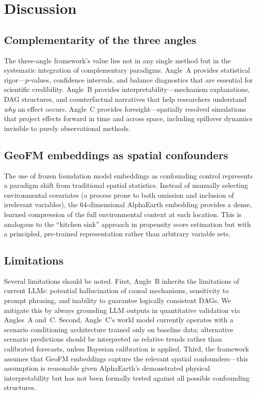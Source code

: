 \documentclass{article}
\begin{document}
\section{Discussion}
\label{sec:discussion}

\subsection{Complementarity of the three angles}

The three-angle framework's value lies not in any single method but in the systematic integration of complementary paradigms. Angle~A provides statistical rigor---$p$-values, confidence intervals, and balance diagnostics that are essential for scientific credibility. Angle~B provides interpretability---mechanism explanations, DAG structures, and counterfactual narratives that help researchers understand \textit{why} an effect occurs. Angle~C provides foresight---spatially resolved simulations that project effects forward in time and across space, including spillover dynamics invisible to purely observational methods.

\subsection{GeoFM embeddings as spatial confounders}

The use of frozen foundation model embeddings as confounding control represents a paradigm shift from traditional spatial statistics. Instead of manually selecting environmental covariates (a process prone to both omission and inclusion of irrelevant variables), the 64-dimensional AlphaEarth embedding provides a dense, learned compression of the full environmental context at each location. This is analogous to the ``kitchen sink'' approach in propensity score estimation but with a principled, pre-trained representation rather than arbitrary variable sets.

\subsection{Limitations}

Several limitations should be noted. First, Angle~B inherits the limitations of current LLMs: potential hallucination of causal mechanisms, sensitivity to prompt phrasing, and inability to guarantee logically consistent DAGs. We mitigate this by always grounding LLM outputs in quantitative validation via Angles~A and~C. Second, Angle~C's world model currently operates with a scenario conditioning architecture trained only on baseline data; alternative scenario predictions should be interpreted as relative trends rather than calibrated forecasts, unless Bayesian calibration is applied. Third, the framework assumes that GeoFM embeddings capture the relevant spatial confounders---this assumption is reasonable given AlphaEarth's demonstrated physical interpretability \citep{rahman2026interpretable} but has not been formally tested against all possible confounding structures.
\end{document}
